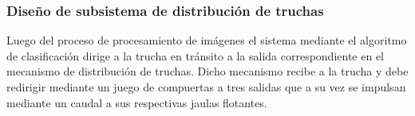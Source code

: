 





\subsubsection{Diseño de subsistema de distribución de truchas}

Luego del proceso de procesamiento de imágenes el sistema mediante el algoritmo de clasificación dirige a la trucha en tránsito a la salida correspondiente en el mecanismo de distribución de truchas. Dicho mecanismo recibe a la trucha y debe redirigir mediante un juego de compuertas a tres salidas que a su vez se impulsan mediante un caudal a sus respectivas jaulas flotantes.

